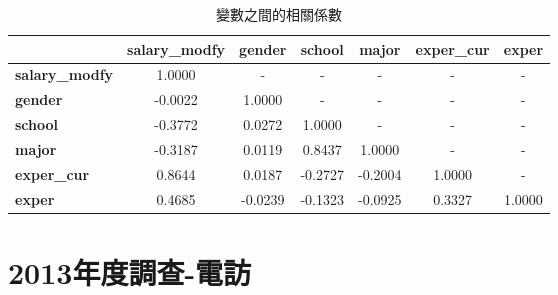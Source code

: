 \documentclass[12pt, a4paper]{article}
\begin{document}
\begin{table}[ht]
\centering
\caption{變數之間的相關係數}
\begin{tabular}{lcccccc}
\toprule
& \textbf{salary\_modfy} & \textbf{gender} & \textbf{school} & \textbf{major} & \textbf{exper\_cur} & \textbf{exper} \\
\midrule
\textbf{salary\_modfy} & 1.0000 & - & - & - & - & - \\
\textbf{gender} & -0.0022 & 1.0000 & - & - & - & - \\
\textbf{school} & -0.3772 & 0.0272 & 1.0000 & - & - & - \\
\textbf{major} & -0.3187 & 0.0119 & 0.8437 & 1.0000 & - & - \\
\textbf{exper\_cur} & 0.8644 & 0.0187 & -0.2727 & -0.2004 & 1.0000 & - \\
\textbf{exper} & 0.4685 & -0.0239 & -0.1323 & -0.0925 & 0.3327 & 1.0000 \\
\bottomrule
\end{tabular}
\end{table}




\section{2013年度調查-電訪}
\end{document}

